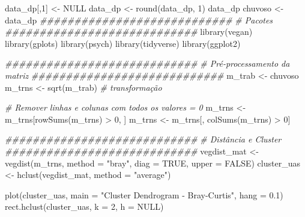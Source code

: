 \documentclass[
  letterpaper,
  DIV=11,
  numbers=noendperiod]{scrartcl}
\newenvironment{Shaded}{}{}
\newcommand{\AttributeTok}[1]{\textcolor[rgb]{0.49,0.56,0.16}{#1}}
\newcommand{\CommentTok}[1]{\textcolor[rgb]{0.38,0.63,0.69}{\textit{#1}}}
\newcommand{\ConstantTok}[1]{\textcolor[rgb]{0.53,0.00,0.00}{#1}}
\newcommand{\DecValTok}[1]{\textcolor[rgb]{0.25,0.63,0.44}{#1}}
\newcommand{\DocumentationTok}[1]{\textcolor[rgb]{0.73,0.13,0.13}{\textit{#1}}}
\newcommand{\FloatTok}[1]{\textcolor[rgb]{0.25,0.63,0.44}{#1}}
\newcommand{\FunctionTok}[1]{\textcolor[rgb]{0.02,0.16,0.49}{#1}}
\newcommand{\NormalTok}[1]{#1}
\newcommand{\OtherTok}[1]{\textcolor[rgb]{0.00,0.44,0.13}{#1}}
\newcommand{\SpecialCharTok}[1]{\textcolor[rgb]{0.25,0.44,0.63}{#1}}
\newcommand{\StringTok}[1]{\textcolor[rgb]{0.25,0.44,0.63}{#1}}
\begin{document}
\begin{Shaded}
\begin{Highlighting}[numbers=left,,]
\NormalTok{data\_dp[,}\DecValTok{1}\NormalTok{] }\OtherTok{\textless{}{-}} \ConstantTok{NULL}
\NormalTok{data\_dp }\OtherTok{\textless{}{-}} \FunctionTok{round}\NormalTok{(data\_dp, }\DecValTok{1}\NormalTok{)}
\NormalTok{data\_dp}
\NormalTok{chuvoso }\OtherTok{\textless{}{-}}\NormalTok{ data\_dp}
\DocumentationTok{\#\#\#\#\#\#\#\#\#\#\#\#\#\#\#\#\#\#\#\#\#\#\#\#\#\#\#\#}
\CommentTok{\# Pacotes}
\DocumentationTok{\#\#\#\#\#\#\#\#\#\#\#\#\#\#\#\#\#\#\#\#\#\#\#\#\#\#\#\#}
\FunctionTok{library}\NormalTok{(vegan)}
\FunctionTok{library}\NormalTok{(gplots)}
\FunctionTok{library}\NormalTok{(psych)}
\FunctionTok{library}\NormalTok{(tidyverse)}
\FunctionTok{library}\NormalTok{(ggplot2)}

\DocumentationTok{\#\#\#\#\#\#\#\#\#\#\#\#\#\#\#\#\#\#\#\#\#\#\#\#\#\#\#\#}
\CommentTok{\# Pré{-}processamento da matriz}
\DocumentationTok{\#\#\#\#\#\#\#\#\#\#\#\#\#\#\#\#\#\#\#\#\#\#\#\#\#\#\#\#}
\NormalTok{m\_trab }\OtherTok{\textless{}{-}}\NormalTok{ chuvoso}
\NormalTok{m\_trns }\OtherTok{\textless{}{-}} \FunctionTok{sqrt}\NormalTok{(m\_trab) }\CommentTok{\# transformação}

\CommentTok{\# Remover linhas e colunas com todos os valores = 0}
\NormalTok{m\_trns }\OtherTok{\textless{}{-}}\NormalTok{ m\_trns[}\FunctionTok{rowSums}\NormalTok{(m\_trns) }\SpecialCharTok{\textgreater{}} \DecValTok{0}\NormalTok{, ]}
\NormalTok{m\_trns }\OtherTok{\textless{}{-}}\NormalTok{ m\_trns[, }\FunctionTok{colSums}\NormalTok{(m\_trns) }\SpecialCharTok{\textgreater{}} \DecValTok{0}\NormalTok{]}

\DocumentationTok{\#\#\#\#\#\#\#\#\#\#\#\#\#\#\#\#\#\#\#\#\#\#\#\#\#\#\#\#}
\CommentTok{\# Distância e Cluster}
\DocumentationTok{\#\#\#\#\#\#\#\#\#\#\#\#\#\#\#\#\#\#\#\#\#\#\#\#\#\#\#\#}
\NormalTok{vegdist\_mat }\OtherTok{\textless{}{-}} \FunctionTok{vegdist}\NormalTok{(m\_trns, }\AttributeTok{method =} \StringTok{"bray"}\NormalTok{, }\AttributeTok{diag =} \ConstantTok{TRUE}\NormalTok{, }\AttributeTok{upper =} \ConstantTok{FALSE}\NormalTok{)}
\NormalTok{cluster\_uas }\OtherTok{\textless{}{-}} \FunctionTok{hclust}\NormalTok{(vegdist\_mat, }\AttributeTok{method =} \StringTok{"average"}\NormalTok{)}

\FunctionTok{plot}\NormalTok{(cluster\_uas, }\AttributeTok{main =} \StringTok{"Cluster Dendrogram {-} Bray{-}Curtis"}\NormalTok{, }\AttributeTok{hang =} \FloatTok{0.1}\NormalTok{)}
\FunctionTok{rect.hclust}\NormalTok{(cluster\_uas, }\AttributeTok{k =} \DecValTok{2}\NormalTok{, }\AttributeTok{h =} \ConstantTok{NULL}\NormalTok{)}


\end{Highlighting}
\end{Shaded}
\end{document}
